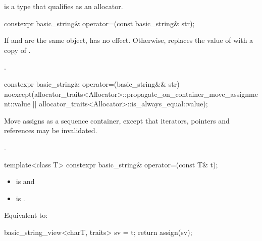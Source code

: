 \begin{itemdescr}
\pnum
\constraints
{} is a type that qualifies as
an allocator.
\end{itemdescr}

%
\begin{itemdecl}
constexpr basic_string& operator=(const basic_string& str);
\end{itemdecl}

\begin{itemdescr}
\pnum
\effects
If  and  are the same object, has no effect.
Otherwise, replaces the value of  with a copy of .

\pnum
\returns
{}.
\end{itemdescr}

%
\begin{itemdecl}
constexpr basic_string& operator=(basic_string&& str)
  noexcept(allocator_traits<Allocator>::propagate_on_container_move_assignment::value ||
           allocator_traits<Allocator>::is_always_equal::value);
\end{itemdecl}

\begin{itemdescr}
\pnum
\effects
Move assigns as a sequence container,
except that iterators, pointers and references may be invalidated.

\pnum
\returns
{}.
\end{itemdescr}

%
\begin{itemdecl}
template<class T>
  constexpr basic_string& operator=(const T& t);
\end{itemdecl}

\begin{itemdescr}
\pnum
\constraints
\begin{itemize}
\item {}
is  and
\item {}
is .
\end{itemize}

\pnum
\effects
Equivalent to:
\begin{codeblock}
basic_string_view<charT, traits> sv = t;
return assign(sv);
\end{codeblock}
\end{itemdescr}

